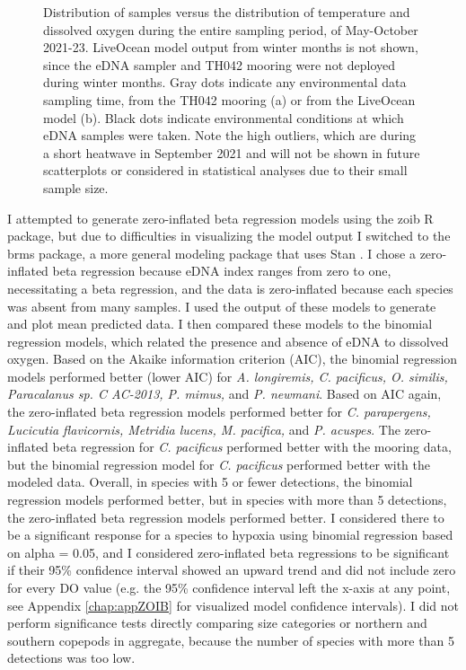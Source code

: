 \documentclass[12pt,twoside]{reedthesis}
\begin{document}
\begin{figure}[!h]
\begin{center}
			\caption[Mooring vs. Model Scatterplot]{Distribution of samples versus the distribution of temperature and dissolved oxygen during the entire sampling period, of May-October 2021-23. LiveOcean model output from winter months is not shown, since the eDNA sampler and TH042 mooring were not deployed during winter months. Gray dots indicate any environmental data sampling time, from the TH042 mooring (a) or from the LiveOcean model (b). Black dots indicate environmental conditions at which eDNA samples were taken. Note the high outliers, which are during a short heatwave in September 2021 and will not be shown in future scatterplots or considered in statistical analyses due to their small sample size.} \label{EnvironmentalConditions}%
		\end{center}
		
	\end{figure} 
	
	I attempted to generate zero-inflated beta regression models using the zoib R package, but due to difficulties in visualizing the model output I switched to the brms package, a more general modeling package that uses Stan \autocite{Burkner2024}. I chose a zero-inflated beta regression because eDNA index ranges from zero to one, necessitating a beta regression, and the data is zero-inflated because each species was absent from many samples. I used the output of these models to generate and plot mean predicted data. I then compared these models to the binomial regression models, which related the presence and absence of eDNA to dissolved oxygen. Based on the Akaike information criterion (AIC), the binomial regression models performed better (lower AIC) for \textit{A. longiremis, C. pacificus, O. similis, Paracalanus sp. C AC-2013, P. mimus,} and \textit{P. newmani}. Based on AIC again, the zero-inflated beta regression models performed better for \textit{C. parapergens, Lucicutia flavicornis, Metridia lucens, M. pacifica,} and \textit{P. acuspes}. The zero-inflated beta regression for \textit{C. pacificus} performed better with the mooring data, but the binomial regression model for \textit{C. pacificus} performed better with the modeled data. Overall, in species with 5 or fewer detections, the binomial regression models performed better, but in species with more than 5 detections, the zero-inflated beta regression models performed better. I considered there to be a significant response for a species to hypoxia using binomial regression based on alpha = 0.05, and I considered zero-inflated beta regressions to be significant if their 95\% confidence interval showed an upward trend and did not include zero for every DO value (e.g. the 95\% confidence interval left the x-axis at any point, see Appendix \ref{chap:appZOIB} for visualized model confidence intervals). I did not perform significance tests directly comparing size categories or northern and southern copepods in aggregate, because the number of species with more than 5 detections was too low. 
\end{document}
